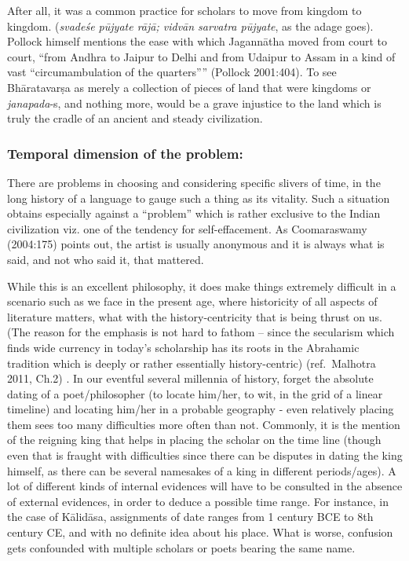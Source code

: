 After all, it was a common practice for scholars to move from kingdom to kingdom. ({\sl svadeśe pūjyate rājā; vidvān sarvatra pūjyate}, as the adage goes). Pollock himself mentions the ease with which Jagannātha moved from court to court, “from Andhra to Jaipur to Delhi and from Udaipur to Assam in a kind of vast “circumambulation of the quarters”” (Pollock 2001:404). To see Bhāratavarṣa as merely a collection of pieces of land that were kingdoms or {\sl janapada}-s, and nothing more, would be a grave injustice to the land which is truly the cradle of an ancient and steady civilization.

\subsubsection{Temporal dimension of the problem:}
\vskip -5pt

There are problems in choosing and considering specific slivers of time, in the long history of a language to gauge such a thing as its vitality. Such a situation obtains especially against a “problem” which is rather exclusive to the Indian civilization viz. one of the tendency for self-effacement. As Coomaraswamy (2004:175) points out, the artist is usually anonymous and it is always what is said, and not who said it, that mattered. 

While this is an excellent philosophy, it does make things extremely difficult in a scenario such as we face in the present age, where historicity of all aspects of literature matters, what with the history-centricity that is being thrust on us. (The reason for the emphasis is not hard to fathom – since the secularism which finds wide currency in today’s scholarship has its roots in the Abrahamic tradition which is deeply or rather essentially history-centric) (ref.\ Malhotra 2011, Ch.2) . In our eventful several millennia of history, forget the absolute dating of a poet/philosopher (to locate him/her, to wit, in the grid of a linear timeline) and locating him/her in a probable geography - even relatively placing them sees too many difficulties more often than not. Commonly, it is the mention of the reigning king that helps in placing the scholar on the time line (though even that is fraught with difficulties since there can be disputes in dating the king himself, as there can be several namesakes of a king in different periods/ages). A lot of different kinds of internal evidences will have to be consulted in the absence of external evidences, in order to deduce a possible time range. For instance, in the case of Kālidāsa, assignments of date ranges from 1 century BCE to 8th century CE, and  with no definite idea about his place. What is worse, confusion gets confounded with multiple scholars or poets bearing the same name.

